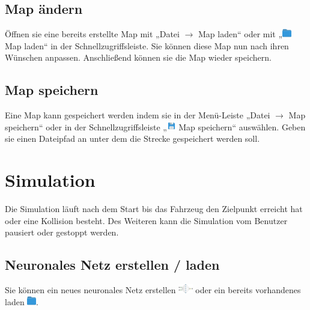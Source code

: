 \documentclass[11pt,a4paper]{article}
\begin{document}
\subsection{Map ändern}
Öffnen sie eine bereits erstellte Map mit „Datei $\rightarrow$ Map laden“ oder mit „\includegraphics[height=11pt]{icon/load} Map laden“ in der Schnellzugriffsleiste. Sie können diese Map nun nach ihren Wünschen anpassen. 
Anschließend können sie die Map wieder speichern.

\subsection{Map speichern}
Eine Map kann gespeichert werden indem sie in der Menü-Leiste „Datei $\rightarrow$ Map speichern“ oder in der Schnellzugriffsleiste „\includegraphics[height=11pt]{icon/save} Map speichern“ auswählen. Geben sie einen Dateipfad an unter dem die Strecke gespeichert werden soll.
\newpage
\section{Simulation}
Die Simulation läuft nach dem Start bis das Fahrzeug den Zielpunkt erreicht hat oder eine Kollision besteht.
Des Weiteren kann die Simulation vom Benutzer pausiert oder gestoppt werden.

\subsection{Neuronales Netz erstellen / laden}
Sie können ein neues neuronales Netz erstellen \includegraphics[height=11pt]{icon/create_Neural_network} oder ein bereits vorhandenes laden \includegraphics[height=11pt]{icon/load}.
\end{document}
